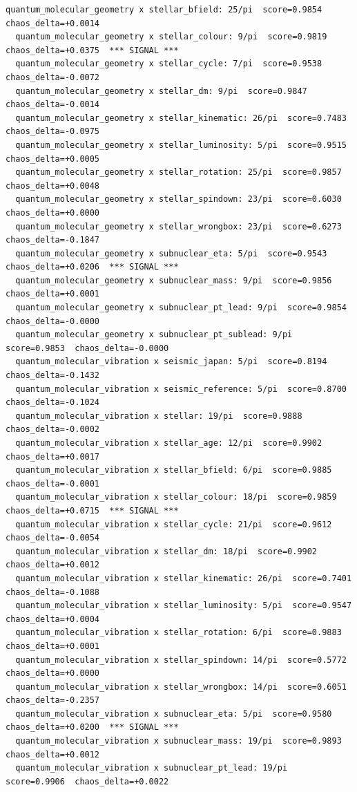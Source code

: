 \documentclass[11pt, letterpaper, openany]{book}
\begin{document}
\begin{empiricalbox}
\begin{lstlisting}[style=terminal]
  quantum_molecular_geometry x stellar_bfield: 25/pi  score=0.9854  chaos_delta=+0.0014
  quantum_molecular_geometry x stellar_colour: 9/pi  score=0.9819  chaos_delta=+0.0375  *** SIGNAL ***
  quantum_molecular_geometry x stellar_cycle: 7/pi  score=0.9538  chaos_delta=-0.0072
  quantum_molecular_geometry x stellar_dm: 9/pi  score=0.9847  chaos_delta=-0.0014
  quantum_molecular_geometry x stellar_kinematic: 26/pi  score=0.7483  chaos_delta=-0.0975
  quantum_molecular_geometry x stellar_luminosity: 5/pi  score=0.9515  chaos_delta=+0.0005
  quantum_molecular_geometry x stellar_rotation: 25/pi  score=0.9857  chaos_delta=+0.0048
  quantum_molecular_geometry x stellar_spindown: 23/pi  score=0.6030  chaos_delta=+0.0000
  quantum_molecular_geometry x stellar_wrongbox: 23/pi  score=0.6273  chaos_delta=-0.1847
  quantum_molecular_geometry x subnuclear_eta: 5/pi  score=0.9543  chaos_delta=+0.0206  *** SIGNAL ***
  quantum_molecular_geometry x subnuclear_mass: 9/pi  score=0.9856  chaos_delta=+0.0001
  quantum_molecular_geometry x subnuclear_pt_lead: 9/pi  score=0.9854  chaos_delta=-0.0000
  quantum_molecular_geometry x subnuclear_pt_sublead: 9/pi  score=0.9853  chaos_delta=-0.0000
  quantum_molecular_vibration x seismic_japan: 5/pi  score=0.8194  chaos_delta=-0.1432
  quantum_molecular_vibration x seismic_reference: 5/pi  score=0.8700  chaos_delta=-0.1024
  quantum_molecular_vibration x stellar: 19/pi  score=0.9888  chaos_delta=-0.0002
  quantum_molecular_vibration x stellar_age: 12/pi  score=0.9902  chaos_delta=+0.0017
  quantum_molecular_vibration x stellar_bfield: 6/pi  score=0.9885  chaos_delta=-0.0001
  quantum_molecular_vibration x stellar_colour: 18/pi  score=0.9859  chaos_delta=+0.0715  *** SIGNAL ***
  quantum_molecular_vibration x stellar_cycle: 21/pi  score=0.9612  chaos_delta=-0.0054
  quantum_molecular_vibration x stellar_dm: 18/pi  score=0.9902  chaos_delta=+0.0012
  quantum_molecular_vibration x stellar_kinematic: 26/pi  score=0.7401  chaos_delta=-0.1088
  quantum_molecular_vibration x stellar_luminosity: 5/pi  score=0.9547  chaos_delta=+0.0004
  quantum_molecular_vibration x stellar_rotation: 6/pi  score=0.9883  chaos_delta=+0.0001
  quantum_molecular_vibration x stellar_spindown: 14/pi  score=0.5772  chaos_delta=+0.0000
  quantum_molecular_vibration x stellar_wrongbox: 14/pi  score=0.6051  chaos_delta=-0.2357
  quantum_molecular_vibration x subnuclear_eta: 5/pi  score=0.9580  chaos_delta=+0.0200  *** SIGNAL ***
  quantum_molecular_vibration x subnuclear_mass: 19/pi  score=0.9893  chaos_delta=+0.0012
  quantum_molecular_vibration x subnuclear_pt_lead: 19/pi  score=0.9906  chaos_delta=+0.0022

\end{lstlisting}
\end{empiricalbox}
\end{document}
